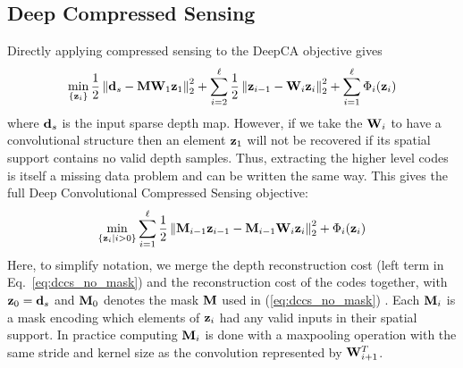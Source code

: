 \subsection{Deep Compressed Sensing}
\label{sec:deep-compr-sens}

Directly applying compressed sensing to the DeepCA objective gives
\begin{equation}
  \min_{\{\mathbf{z}_i\}} \frac{1}{2} \left\Vert \mathbf{d}_s - \mathbf{M}\mathbf{W}_1\mathbf{z}_1 \right\Vert_2^2  +  \sum_{i=2}^{\ell} \frac{1}{2} \left\Vert \mathbf{z}_{i-1} - \mathbf{W}_i\mathbf{z}_i\right\Vert_2^2 + \sum_{i=1}^{\ell}\Phi_i(\mathbf{z}_i) 
  \label{eq:dccs_no_mask}
\end{equation}
where $\mathbf{d}_s$ is the input sparse depth map. However, if we take the $\mathbf{W}_i$ to have a convolutional structure then an element $\mathbf{z}_1$ will not be recovered if its spatial support contains no valid depth samples. Thus, extracting the higher level codes is itself a missing data problem and can be written the same way. This gives the full Deep Convolutional Compressed Sensing objective:
\begin{equation}
  \label{eq:dccs}
  \min_{\{\mathbf{z}_i \vert i>0\}} \sum_{i=1}^{\ell} \frac{1}{2} \left\Vert \mathbf{M}_{i-1}\mathbf{z}_{i-1} - \mathbf{M}_{i-1}\mathbf{W}_i\mathbf{z}_i\right\Vert_2^2 + \Phi_i(\mathbf{z}_i)
\end{equation}
Here, to simplify notation, we merge the depth reconstruction cost (left term in Eq.~\ref{eq:dccs_no_mask}) and the reconstruction cost of the codes together, with $\mathbf{z}_0 = \mathbf{d}_s$ and $\mathbf{M}_0$ denotes the mask $\mathbf{M}$ used in (\ref{eq:dccs_no_mask}) . Each $\mathbf{M}_i$ is a mask encoding which elements of $\mathbf{z}_i$ had any valid inputs in their spatial support. In practice computing $\mathbf{M}_i$ is done with a maxpooling operation with the same stride and kernel size as the convolution represented by $\mathbf{W}_{i+1}^T$.\\

